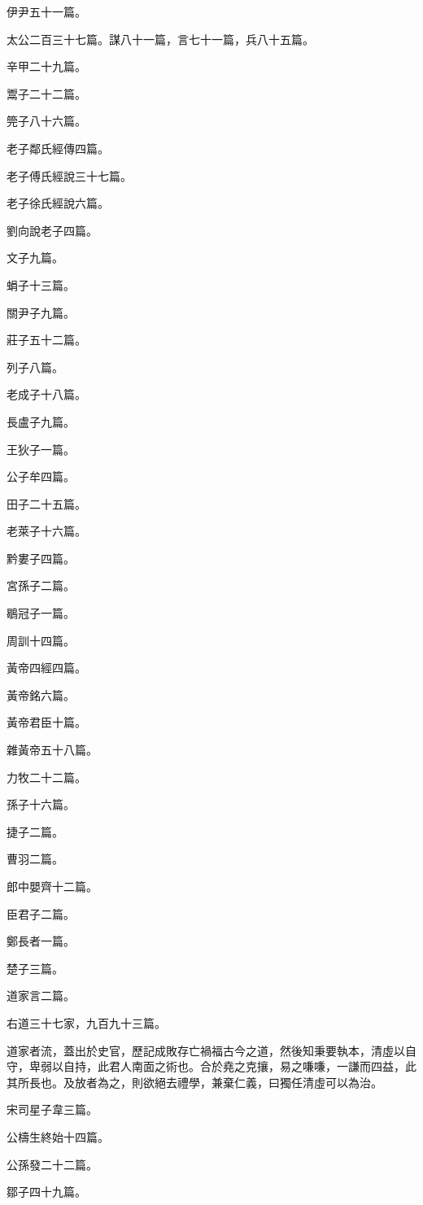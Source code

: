 \begin{pinyinscope}
伊尹五十一篇。

太公二百三十七篇。謀八十一篇，言七十一篇，兵八十五篇。

辛甲二十九篇。

鬻子二十二篇。

筦子八十六篇。

老子鄰氏經傳四篇。

老子傅氏經說三十七篇。

老子徐氏經說六篇。

劉向說老子四篇。

文子九篇。

蜎子十三篇。

關尹子九篇。

莊子五十二篇。

列子八篇。

老成子十八篇。

長盧子九篇。

王狄子一篇。

公子牟四篇。

田子二十五篇。

老萊子十六篇。

黔婁子四篇。

宮孫子二篇。

鶡冠子一篇。

周訓十四篇。

黃帝四經四篇。

黃帝銘六篇。

黃帝君臣十篇。

雜黃帝五十八篇。

力牧二十二篇。

孫子十六篇。

捷子二篇。

曹羽二篇。

郎中嬰齊十二篇。

臣君子二篇。

鄭長者一篇。

楚子三篇。

道家言二篇。

右道三十七家，九百九十三篇。

道家者流，蓋出於史官，歷記成敗存亡禍福古今之道，然後知秉要執本，清虛以自守，卑弱以自持，此君人南面之術也。合於堯之克攘，易之嗛嗛，一謙而四益，此其所長也。及放者為之，則欲絕去禮學，兼棄仁義，曰獨任清虛可以為治。

宋司星子韋三篇。

公檮生終始十四篇。

公孫發二十二篇。

鄒子四十九篇。


\end{pinyinscope}
